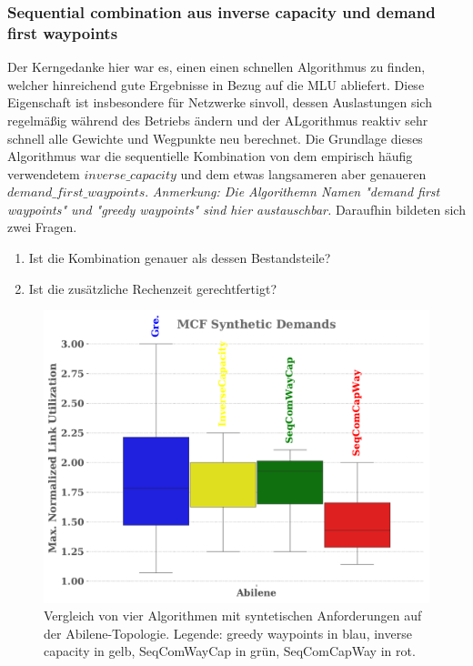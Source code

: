 \documentclass[sigconf, nonacm, review]{acmart}
\begin{document}
\subsubsection{Sequential combination aus inverse capacity und demand first waypoints}
Der Kerngedanke hier war es, einen einen schnellen Algorithmus zu finden, 
welcher hinreichend gute Ergebnisse in Bezug auf die MLU abliefert.
Diese Eigenschaft ist insbesondere f\"ur Netzwerke sinvoll,
dessen Auslastungen sich regelm\"a\ss ig w\"ahrend des Betriebs \"andern und der ALgorithmus reaktiv sehr schnell alle Gewichte und Wegpunkte neu berechnet.
Die Grundlage dieses Algorithmus war die sequentielle Kombination von dem empirisch h\"aufig verwendetem $inverse\_capacity$ und dem etwas langsameren aber genaueren $demand\_first\_waypoints$.
\emph{Anmerkung: Die Algorithemn Namen "demand first waypoints" und "greedy waypoints" sind hier austauschbar.}\newline
Daraufhin bildeten sich zwei Fragen.
\begin{enumerate}
    \item Ist die Kombination genauer als dessen Bestandsteile?
    \item Ist die zus\"atzliche Rechenzeit gerechtfertigt?
\end{enumerate}
\begin{figure}
\centering
\includegraphics[width=\linewidth]{figures/pouria_all_algorithms_abilene.pdf}
\caption{Vergleich von vier Algorithmen mit syntetischen Anforderungen auf der Abilene-Topologie. Legende: greedy waypoints in blau, inverse capacity in gelb, SeqComWayCap in gr\"un, SeqComCapWay in rot.}
\label{fig:pouriaBoxplotSynthetic}
\end{figure}
\end{document}
